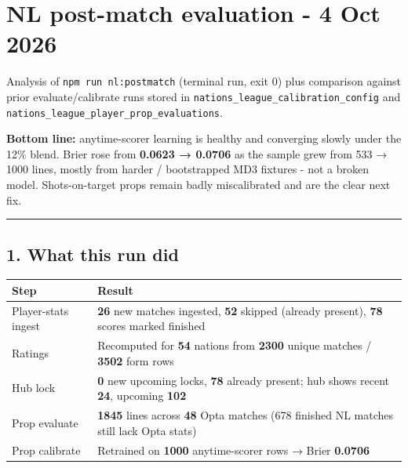 \documentclass[
]{article}
\author{}
\date{\vspace{-2.5em}}
\newcounter{none} %
\begin{document}
\section{NL post-match evaluation - 4 Oct
2026}\label{nl-post-match-evaluation---4-oct-2026}

Analysis of \texttt{npm\ run\ nl:postmatch} (terminal run, exit 0) plus
comparison against prior evaluate/calibrate runs stored in
\texttt{nations\_league\_calibration\_config} and
\texttt{nations\_league\_player\_prop\_evaluations}.

\textbf{Bottom line:} anytime-scorer learning is healthy and converging
slowly under the 12\% blend. Brier rose from \textbf{0.0623 → 0.0706} as
the sample grew from 533 → 1000 lines, mostly from harder / bootstrapped
MD3 fixtures - not a broken model. Shots-on-target props remain badly
miscalibrated and are the clear next fix.

\begin{center}\rule{0.5\linewidth}{0.5pt}\end{center}

\subsection{1. What this run did}\label{what-this-run-did}

{\def\LTcaptype{none} %
\begin{longtable}[]{@{}
  >{\raggedright\arraybackslash}p{}
  >{\raggedright\arraybackslash}p{}@{}}
\toprule\noalign{}
\begin{minipage}[b]{\linewidth}\raggedright
Step
\end{minipage} & \begin{minipage}[b]{\linewidth}\raggedright
Result
\end{minipage} \\
\midrule\noalign{}
\endhead
\bottomrule\noalign{}
\endlastfoot
Player-stats ingest & \textbf{26} new matches ingested, \textbf{52}
skipped (already present), \textbf{78} scores marked finished \\
Ratings & Recomputed for \textbf{54} nations from \textbf{2300} unique
matches / \textbf{3502} form rows \\
Hub lock & \textbf{0} new upcoming locks, \textbf{78} already present;
hub shows recent \textbf{24}, upcoming \textbf{102} \\
Prop evaluate & \textbf{1845} lines across \textbf{48} Opta matches (678
finished NL matches still lack Opta stats) \\
Prop calibrate & Retrained on \textbf{1000} anytime-scorer rows → Brier
\textbf{0.0706} \\
\end{longtable}
}
\end{document}
